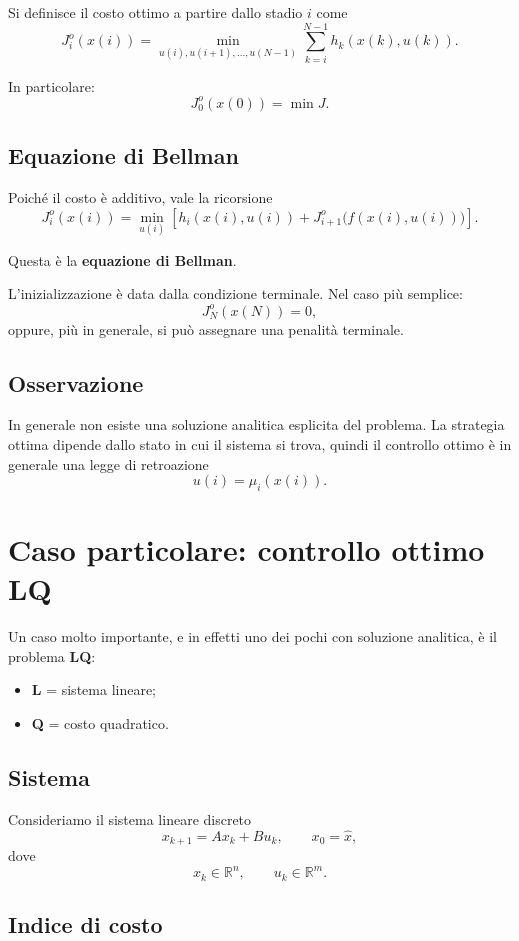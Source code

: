Si definisce il costo ottimo a partire dallo stadio \(i\) come
\[
J_i^o(x(i))
=
\min_{u(i),u(i+1),\dots,u(N-1)}
\sum_{k=i}^{N-1} h_k(x(k),u(k)).
\]

In particolare:
\[
J_0^o(x(0))=\min J.
\]

\subsection{Equazione di Bellman}

Poiché il costo è additivo, vale la ricorsione
\[
J_i^o(x(i))
=
\min_{u(i)}
\left[
h_i(x(i),u(i))
+
J_{i+1}^o\bigl(f(x(i),u(i))\bigr)
\right].
\]

Questa è la \textbf{equazione di Bellman}.

L'inizializzazione è data dalla condizione terminale. Nel caso più semplice:
\[
J_N^o(x(N))=0,
\]
oppure, più in generale, si può assegnare una penalità terminale.

\subsection{Osservazione}

In generale non esiste una soluzione analitica esplicita del problema.
La strategia ottima dipende dallo stato in cui il sistema si trova, quindi il controllo
ottimo è in generale una legge di retroazione
\[
u(i)=\mu_i(x(i)).
\]

\section{Caso particolare: controllo ottimo LQ}

Un caso molto importante, e in effetti uno dei pochi con soluzione analitica,
è il problema \textbf{LQ}:
\begin{itemize}
    \item \textbf{L} = sistema lineare;
    \item \textbf{Q} = costo quadratico.
\end{itemize}

\subsection{Sistema}

Consideriamo il sistema lineare discreto
\[
x_{k+1}=Ax_k+Bu_k,
\qquad
x_0=\hat x,
\]
dove
\[
x_k\in\mathbb{R}^n,\qquad
u_k\in\mathbb{R}^m.
\]

\subsection{Indice di costo}


